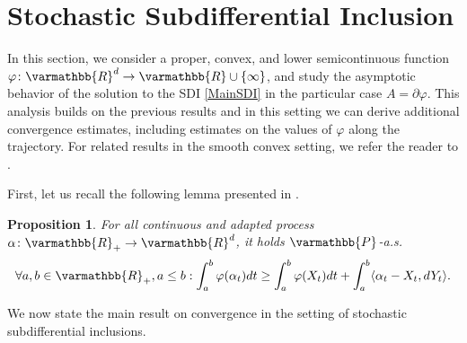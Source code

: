 \documentclass[11pt,reqno]{article}
\let\mathbb=\varmathbb
\newcommand{\R}{\mathbb{R}}
\newcommand{\1}{\mathds{1}}
\numberwithin{equation}{section}  %
\theoremstyle{plain}
\newtheorem{proposition}[theorem]{Proposition}
\theoremstyle{definition}
\theoremstyle{remark}
\numberwithin{theorem}{section}
\numberwithin{remark}{section}
\numberwithin{example}{section}
\begin{document}
    \section{Stochastic Subdifferential Inclusion}\label{Section5}

In this section, we consider a proper, convex, and lower semicontinuous function 
$\varphi \colon \mathbb{R}^d \to \mathbb{R} \cup \{\infty\}$, and study the asymptotic behavior of the solution to the SDI \eqref{MainSDI} in the particular case $A = \partial \varphi$. This analysis builds on the previous results and in this setting we can derive additional convergence estimates, including estimates on the values of $\varphi$ along the trajectory. For related results in the smooth convex setting, we refer the reader to \cite{MR4989859, MR3747470}. 



First, let us recall the following lemma presented in  \cite[Proposition 6.36]{MR3308895}.
    \begin{proposition}\label{prop-ineq-convex}
    	For all continuous and adapted process $\alpha\colon \R_+\to \R^d$, it holds $\mathbb{P}$-a.s. 
    	\begin{equation*}
    		\forall a,b\in \R_+, a\leq b : \int_a^b \varphi(\alpha_t)dt\geq \int_a^b\varphi(X_t)dt + \int_a^b\langle \alpha_t-X_t,dY_t\rangle.
    	\end{equation*}
    \end{proposition}
We now state the main result on convergence in the setting of stochastic subdifferential inclusions.
\end{document}
